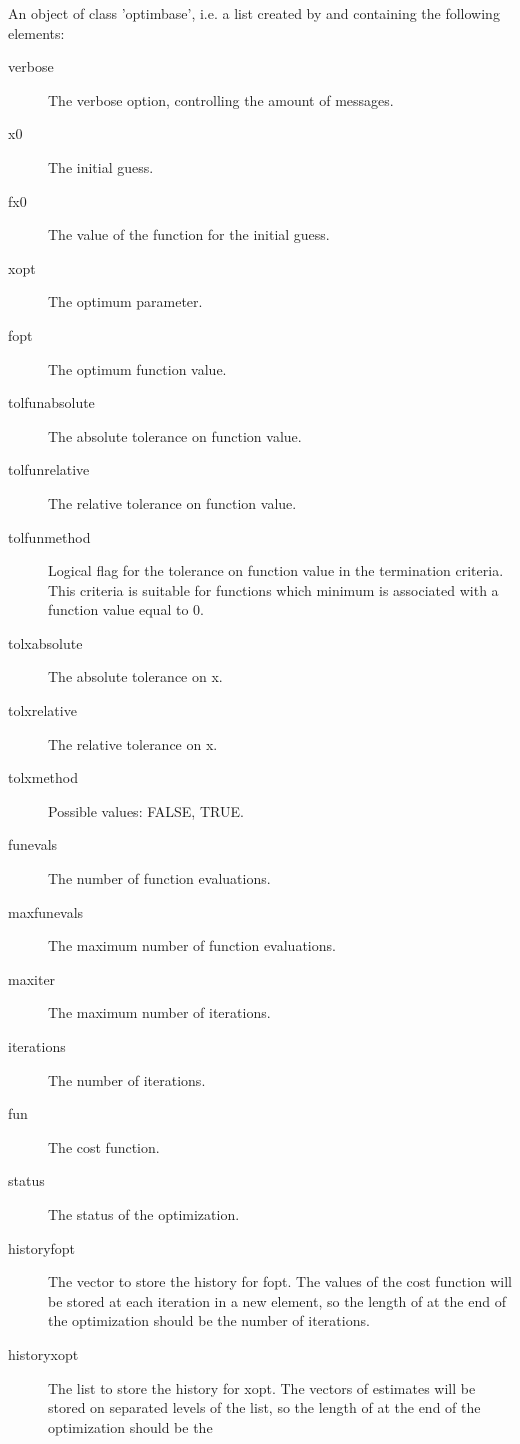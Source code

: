 \begin{Arguments}
\begin{ldescription}
\item[\code{optbase}] An object of class 'optimbase', i.e. a list created by 
 and containing the following elements: \begin{description}

\item[verbose] The verbose option, controlling the amount of messages.
\item[x0] The initial guess.
\item[fx0] The value of the function for the initial guess.
\item[xopt] The optimum parameter.
\item[fopt] The optimum function value.
\item[tolfunabsolute] The absolute tolerance on function value.
\item[tolfunrelative] The relative tolerance on function value.
\item[tolfunmethod] Logical flag for the tolerance on function value in
the termination criteria. This criteria is suitable for functions which
minimum is associated with a function value equal to 0.
\item[tolxabsolute] The absolute tolerance on x.
\item[tolxrelative] The relative tolerance on x.
\item[tolxmethod] Possible values: FALSE, TRUE.
\item[funevals] The number of function evaluations.
\item[maxfunevals] The maximum number of function evaluations.
\item[maxiter] The maximum number of iterations.
\item[iterations] The number of iterations.
\item[fun] The cost function.
\item[status] The status of the optimization.
\item[historyfopt] The vector to store the history for fopt. The values of
the cost function will be stored at each iteration in a new element, so
the length of  at the end of the optimization should
be the number of iterations.
\item[historyxopt] The list to store the history for xopt. The vectors of 
estimates will be stored on separated levels of the list, so the length
of  at the end of the optimization should be the

\end{description}
\end{ldescription}
\end{Arguments}
